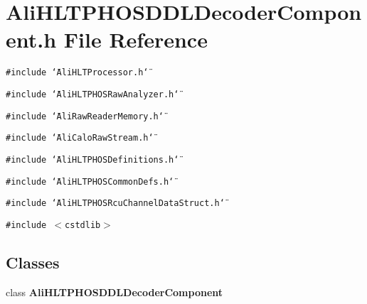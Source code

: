 \section{Ali\-HLTPHOSDDLDecoder\-Component.h File Reference}
\label{AliHLTPHOSDDLDecoderComponent_8h}


{\tt \#include \char`\"{}Ali\-HLTProcessor.h\char`\"{}}\par
{\tt \#include \char`\"{}Ali\-HLTPHOSRaw\-Analyzer.h\char`\"{}}\par
{\tt \#include \char`\"{}Ali\-Raw\-Reader\-Memory.h\char`\"{}}\par
{\tt \#include \char`\"{}Ali\-Calo\-Raw\-Stream.h\char`\"{}}\par
{\tt \#include \char`\"{}Ali\-HLTPHOSDefinitions.h\char`\"{}}\par
{\tt \#include \char`\"{}Ali\-HLTPHOSCommon\-Defs.h\char`\"{}}\par
{\tt \#include \char`\"{}Ali\-HLTPHOSRcu\-Channel\-Data\-Struct.h\char`\"{}}\par
{\tt \#include $<$cstdlib$>$}\par
\subsection*{Classes}
\begin{CompactItemize}
\item 
class {\bf Ali\-HLTPHOSDDLDecoder\-Component}
\end{CompactItemize}
